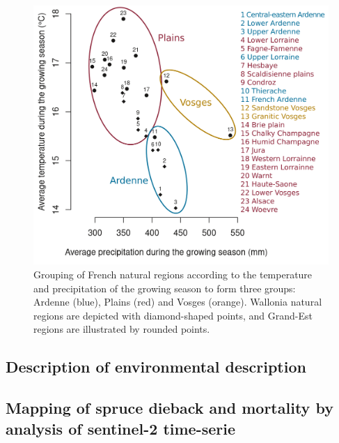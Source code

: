 \documentclass[3p,procedia]{elsarticle}
\begin{document}
\begin{figure}
	\centering
\includegraphics[width=0.8\linewidth]{climat/climat_region.png}
\caption{Grouping of French natural regions according to the temperature and precipitation of the growing season to form three groups: Ardenne (blue), Plains (red) and Vosges (orange). Wallonia natural regions are depicted with diamond-shaped points, and Grand-Est regions are illustrated by rounded points.}
	\label{fig:clim}
\end{figure}







\subsection{Description of environmental description}




\subsection{Mapping of spruce dieback and mortality by analysis of sentinel-2 time-serie}
\end{document}
